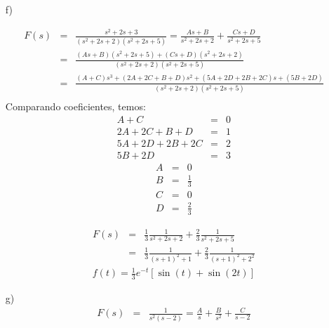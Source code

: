\begin{Answer}
\begin{itemize}
 \item [f)]

\begin{eqnarray*}
F(s)&=&\frac{s^2+2s+3}{(s^2+2s+2)(s^2+2s+5)}=\frac{As+B}{s^2+2s+2}+\frac{Cs+D}{s^2+2s+5}\\
&=&\frac{(As+B)(s^2+2s+5)+(Cs+D)(s^2+2s+2)}{(s^2+2s+2)(s^2+2s+5)}\\
&=&\frac{(A+C)s^3+(2A+2C+B+D)s^2+(5A+2D+2B+2C)s+(5B+2D)}{(s^2+2s+2)(s^2+2s+5)}\\
\end{eqnarray*}
Comparando coeficientes, temos:
\begin{eqnarray*}
A+C&=&0\\
2A+2C+B+D&=&1\\
5A+2D+2B+2C&=&2\\
5B+2D&=&3
\end{eqnarray*}
\begin{eqnarray*}
A&=&0  \\
B&=&\frac{1}{3}  \\
C&=& 0 \\
D&=&\frac{2}{3}  
\end{eqnarray*}

\begin{eqnarray*}
F(s)&=&\frac{1}{3}\frac{1}{s^2+2s+2}+\frac{2}{3}\frac{1}{s^2+2s+5}\\
&=&\frac{1}{3}\frac{1}{(s+1)^2+1}+\frac{2}{3}\frac{1}{(s+1)^2+2^2}
\end{eqnarray*}
\begin{eqnarray*}
f(t)=\frac{1}{3}e^{-t}\left[\sin(t)+\sin(2t)\right]
\end{eqnarray*}

 \item [g)]
\begin{eqnarray*}
F(s)&=&\frac{1}{s^2(s-2)}=\frac{A}{s}+\frac{B}{s^2}+\frac{C}{s-2}
\end{eqnarray*}

\end{itemize}
 
\end{Answer}



%